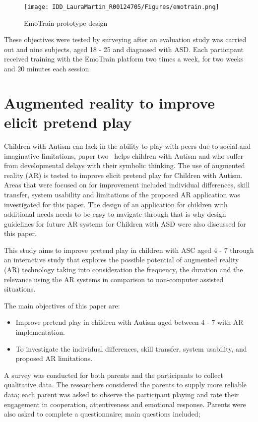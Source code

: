   \begin{figure}[h]
\centering
\texttt{[image: IDD\_LauraMartin\_R00124705/Figures/emotrain.png]}
\caption{EmoTrain prototype design}
\end{figure}

These objectives were tested by surveying after an evaluation study was carried out and nine subjects, aged 18 - 25 and diagnosed with ASD. Each participant received training with the EmoTrain platform two times a week, for two weeks and 20 minutes each session. 

\section{Augmented reality to improve elicit pretend play}
Children with Autism can lack in the ability to play with peers due to social and imaginative limitations, paper two~\cite{Reference20} helps children with Autism and who suffer from developmental delays with their symbolic thinking. The use of augmented reality (AR) is tested to improve elicit pretend play for Children with Autism. Areas that were focused on for improvement included individual differences, skill transfer, system usability and limitations of the proposed AR application was investigated for this paper. The design of an application for children with additional needs needs to be easy to navigate through that is why design guidelines for future AR systems for Children with ASD were also discussed for this paper. 

  This study aims to improve pretend play in children with ASC aged 4 - 7 through an interactive study that explores the possible potential of augmented reality (AR) technology taking into consideration the frequency, the duration and the relevance using the AR systems in comparison to non-computer assisted situations. 
  
  The main objectives of this paper are:
\begin{itemize}
    \item Improve pretend  play in children with Autism aged between 4 - 7 with AR implementation.  
    \item To investigate the individual differences, skill transfer, system usability, and proposed AR limitations.
\end{itemize}
  
  A  survey was conducted for both parents and the participants to collect qualitative data. The researchers considered the parents to supply more reliable data; each parent was asked to observe the participant playing and rate their engagement in cooperation, attentiveness and emotional response. Parents were also asked to complete a questionnaire; main questions included;
 
